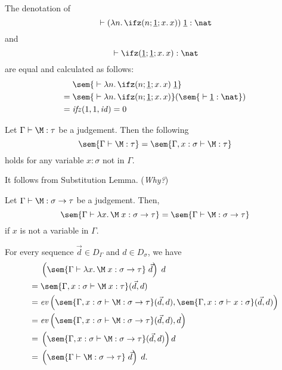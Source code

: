 \begin{frame}
  \begin{example}
    The denotation of 
    \[
      {}\vdash (\lambda n.\,\ifz(n; \underline{1}; x.\, x))\;\underline{1} : \nat
    \]
    and
    \[
      {}\vdash \ifz(\underline{1}; \underline{1}; x.\,x) : \nat
    \]
    are equal and calculated as follows:
    \begin{align*}
          & \sem{{}\vdash \lambda n.\,\ifz(n; \underline{1}; x.\,x)\;\underline{1}}\\
      ={} & \sem{{}\vdash \lambda n.\,\ifz(n; \underline{1}; x.\,x)}( \sem{{}\vdash
        \underline{1} : \nat}) \\
      ={} & \mathit{ifz}(1, 1, \mathit{id}) = 0
    \end{align*}
  \end{example} 
\end{frame}

\begin{frame}
  \begin{lemma}[Weakening]
    Let $\Gamma \vdash \M : \tau$ be a judgement. Then the following
    \[
      \sem{\Gamma \vdash \M : \tau} 
      = \sem{\Gamma, x : \sigma \vdash \M : \tau} 
    \]
    holds for any variable $x : \sigma$ not in $\Gamma$. 
  \end{lemma}
  It follows from Substitution Lemma. (\emph{Why?})
\end{frame}

\begin{frame}
  \begin{corollary}
    Let $\Gamma \vdash \M : \sigma \to \tau$ be a judgement. Then, 
    \[
      \sem{\Gamma \vdash \lambda x.\, \M\; x : \sigma\to\tau}
      = \sem{\Gamma \vdash \M : \sigma\to\tau}
    \]
    if $x$ is not a variable in $\Gamma$. 
  \end{corollary}
  For every sequence $\vec{d} \in D_\Gamma$ and $d \in D_\sigma$, we have
  \begin{align*}
    & \left( \sem{\Gamma \vdash \lambda x.\, \M\; x : \sigma \to \tau}
      \;\vec{d}\right)\; d \\
    ={} & \sem{\Gamma, x : \sigma \vdash \M\;x : \tau}(\vec{d}, d) \\
    ={} & \mathit{ev}\left(
      \sem{\Gamma, x : \sigma \vdash \M : \sigma\to\tau}(\vec{d}, d), 
      \sem{\Gamma, x : \sigma \vdash x : \sigma}(\vec{d}, d)\right)\\
    ={} & \mathit{ev}\left(
      \sem{\Gamma, x : \sigma \vdash \M : \sigma\to\tau}(\vec{d}, d), d\right)\\
    ={} & \left( \sem{\Gamma, x : \sigma \vdash \M : \sigma \to \tau}
      (\vec{d}, d)\right) d \\
    ={} & \left( \sem{\Gamma \vdash \M : \sigma \to \tau}\;\vec{d}\right)\;d. 
  \end{align*}
\end{frame}

